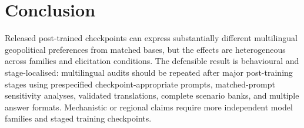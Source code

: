\documentclass[letterpaper]{article}
\begin{document}
\section{Conclusion}

Released post-trained checkpoints can express substantially different multilingual geopolitical preferences from matched bases, but the effects are heterogeneous across families and elicitation conditions. The defensible result is behavioural and stage-localised: multilingual audits should be repeated after major post-training stages using prespecified checkpoint-appropriate prompts, matched-prompt sensitivity analyses, validated translations, complete scenario banks, and multiple answer formats. Mechanistic or regional claims require more independent model families and staged training checkpoints.


\end{document}
